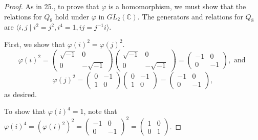 \documentclass{article}
\begin{document}
\begin{proof}
    As in 25., to prove that $\varphi$ is a homomorphism, we must show that the relations for $Q_8$ hold under $\varphi$ in $GL_2(\mathbb{C})$. The generators and relations for $Q_8$ are $\langle i, j \mid i^2 = j^2, i^4 = 1, ij = j^{-1}i \rangle$.

    First, we show that $\varphi(i)^2 = \varphi(j)^2$.
    \begin{equation*}
        \varphi(i)^2 = \begin{pmatrix}\sqrt{-1} & 0 \\ 0 & -\sqrt{-1}\end{pmatrix}\begin{pmatrix}\sqrt{-1} & 0 \\ 0 & -\sqrt{-1}\end{pmatrix} = \begin{pmatrix}-1 & 0 \\ 0 & -1\end{pmatrix}, \text{ and }
    \end{equation*}
    \begin{equation*}
        \varphi(j)^2 = \begin{pmatrix}0 & -1 \\ 1 & 0\end{pmatrix}\begin{pmatrix}0 & -1 \\ 1 & 0\end{pmatrix} = \begin{pmatrix}-1 & 0 \\ 0 & -1\end{pmatrix},
    \end{equation*}
    as desired.

    To show that $\varphi(i)^4 = 1$, note that $\varphi(i)^4 = (\varphi(i)^2)^2 = \begin{pmatrix}-1 & 0 \\ 0 & -1\end{pmatrix}^2 = \begin{pmatrix}1 & 0 \\ 0 & 1\end{pmatrix}$.


\end{proof}
\end{document}
